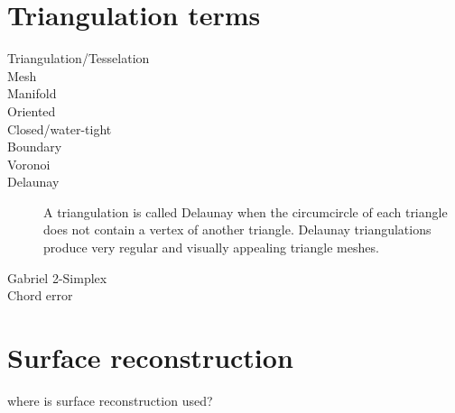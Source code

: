 \section{Triangulation terms}
\label{sec:definitions}

\begin{description}
	\item[Triangulation/Tesselation]
	
	\item[Mesh]
	
	\item[Manifold]
	
	\item[Oriented]
	
	\item[Closed/water-tight]
	
	\item[Boundary]
	
	\item[Voronoi]
	
	\item[Delaunay]
	A triangulation is called Delaunay when the circumcircle of each triangle does not contain a vertex of another triangle.
	Delaunay triangulations produce very regular and visually appealing triangle meshes.
	
	\item[Gabriel 2-Simplex]
	
	\item[Chord error]
	
\end{description}


\section{Surface reconstruction}
\label{sec:surface_reconstruction}

where is surface reconstruction used?
